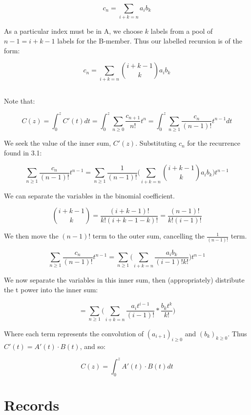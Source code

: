 \documentclass{article}
\begin{document}
$$c_n = \sum_{i + k = n} a_ib_k$$

As a particular index must be in A, we choose $k$ labels from a pool of $n-1 = i + k - 1$ labels for the B-member. Thus our labelled recursion is of the form:

$$c_n = \sum_{i + k = n} \binom{i + k - 1}{k}a_ib_k$$

\subsection{}

Note that:

$$C(z) =  \int_{0}^{z} C'(t) dt = \int_{0}^{z} \sum_{n \ge 0} \frac{c_{n+1}}{n!}t^{n}  = \int_{0}^{z} \sum_{n \ge 1} \frac{c_n}{(n-1)!}t^{n-1}  dt$$ 

We seek the value of the inner sum, $C'(z)$. Substituting $c_n$ for the recurrence found in 3.1:

$$\sum_{n \ge 1}\frac{c_n}{(n-1)!}t^{n-1}  = \sum_{n \ge 1}\frac{1}{(n-1)!} \bigg( \sum_{i + k = n} \binom{i + k - 1}{k}a_ib_k\bigg)t^{n-1}$$

We can separate the variables in the binomial coefficient.

$$\binom{i + k - 1}{k} = \frac{(i+k-1)!}{k!(i + k - 1 - k)!} = \frac{(n-1)!}{k!(i-1)!} $$

We then move the $(n-1)!$ term to the outer sum, cancelling the $\frac{1}{(n-1)!}$ term.

$$\sum_{n \ge 1}\frac{c_n}{(n-1)!}t^{n-1}  = \sum_{n \ge 1} \bigg( \sum_{i + k = n} \frac{a_ib_k}{(i-1)!k!}\bigg)t^{n-1}$$

We now separate the variables in this inner sum, then (appropriately) distribute the t power into the inner sum:

$$ = \sum_{n \ge 1} \bigg( \sum_{i + k = n} \frac{a_it^{i-1}}{(i-1)!} * \frac{b_kt^k}{k!}\bigg)$$

Where each term represents the convolution of $(a_{i+1})_{i \ge 0}$ and $(b_{k})_{k \ge 0}$. Thus $C'(t) = A'(t) \cdot B(t)$, and so:

$$C(z) = \int_{0}^{z} A'(t) \cdot B(t) dt$$

\section{Records}
\end{document}

